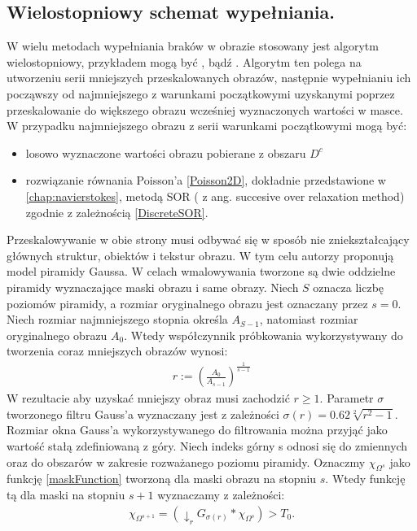 \documentclass[12pt, twoside, openany]{report}
\theoremstyle{definition}
\begin{document}
\subsection{Wielostopniowy schemat wypełniania.}
W wielu metodach wypełniania braków w obrazie stosowany jest algorytm wielostopniowy, przykładem mogą być \cite{kawai2009image}, \cite{komodakis2007image} bądź \cite{wexler2007space}. Algorytm ten polega na utworzeniu serii mniejszych przeskalowanych obrazów, następnie wypełnianiu ich począwszy od najmniejszego z warunkami początkowymi uzyskanymi poprzez przeskalowanie do większego obrazu wcześniej wyznaczonych wartości w masce. W przypadku najmniejszego obrazu z serii warunkami początkowymi mogą być:
\begin{itemize}
\item
losowo wyznaczone wartości obrazu pobierane z obszaru $D^c$
\item
rozwiązanie równania Poisson'a \eqref{Poisson2D}, dokładnie przedstawione w \autoref{chap:navierstokes}, metodą SOR ( z ang. succesive over relaxation method) zgodnie z zależnością \eqref{DiscreteSOR}.
\end{itemize}
Przeskalowywanie w obie strony musi odbywać się w sposób nie zniekształcający głównych struktur, obiektów i tekstur obrazu. W tym celu autorzy \cite{arias2011variational} proponują model piramidy Gaussa. W celach wmalowywania tworzone są dwie oddzielne piramidy wyznaczające maski obrazu i same obrazy. Niech $S$ oznacza liczbę poziomów piramidy, a rozmiar oryginalnego obrazu jest oznaczany przez $s=0$. Niech rozmiar najmniejszego stopnia określa $A_{S-1}$, natomiast rozmiar oryginalnego obrazu $A_{0}$. Wtedy współczynnik próbkowania wykorzystywany do tworzenia coraz mniejszych obrazów wynosi:
\begin{align}
r := \left(\frac{A_0}{A_{s-1}}\right)^\frac{1}{s-1}
\end{align}
W rezultacie aby uzyskać mniejszy obraz musi zachodzić $r \geq 1$. Parametr $\sigma$ tworzonego filtru Gauss'a wyznaczany jest z zależności $\sigma(r)=0.62\sqrt[2]{r^2-1}$. Rozmiar okna Gauss'a wykorzystywanego do filtrowania można przyjąć jako wartość stałą zdefiniowaną z góry. Niech indeks górny s odnosi się do zmiennych oraz do obszarów w zakresie rozważanego poziomu piramidy. Oznaczmy $\chi_{\Omega^{s}}$ jako funkcję \eqref{maskFunction} tworzoną dla maski obrazu na stopniu $s$. Wtedy funkcję tą dla maski na stopniu $s+1$ wyznaczamy z zależności:
\begin{align}
\chi_{\Omega^{s+1}}=(\downarrow_r G_{\sigma(r)} \ast \chi_{\Omega^s}) > T_{0}.
\end{align}
\end{document}
